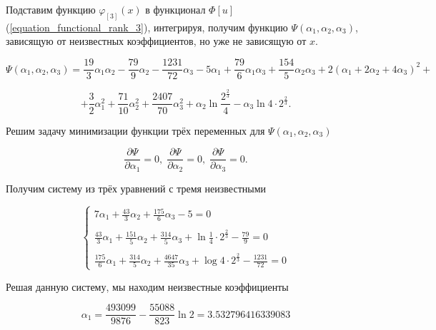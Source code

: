 \documentclass{article}
\begin{document}
\noindent Подставим функцию $\varphi_{[3]}(x)$ в функционал $\Phi[u]$ (\ref{equation_functional_rank_3}), интегрируя, получим функцию $\Psi(\alpha_{1}, \alpha_{2}, \alpha_{3})$, зависящую от неизвестных коэффициентов, но уже не зависящую от $x$.

\begin{displaymath}
	\Psi(\alpha_{1}, \alpha_{2}, \alpha_{3}) = \frac{19}{3}\alpha_{1}\alpha_{2} - \frac{79}{9}\alpha_{2} - \frac{1231}{72}\alpha_{3} - 5\alpha_{1} + \frac{79}{6}\alpha_{1}\alpha_{3} + \frac{154}{5}\alpha_{2}\alpha_{3} + 2(\alpha_{1} + 2 \alpha_{2} + 4\alpha_{3})^2 +
\end{displaymath}
	
\begin{displaymath}	
	 + \frac{3}{2}\alpha_{1}^{2} +  \frac{71}{10}\alpha_{2}^{2} + \frac{2407}{70}\alpha_{3}^{2} + \alpha_{2} \ln{\frac{2^{\frac{2}{3}}}{4}} - \alpha_{3} \ln{4 \cdot 2^{\frac{2}{3}}}.
\end{displaymath}

\noindent Решим задачу минимизации функции трёх переменных для $\Psi(\alpha_{1}, \alpha_{2}, \alpha_{3})$

\begin{displaymath}
	\frac{\partial \Psi}{\partial \alpha_{1}} = 0, \;
	\frac{\partial \Psi}{\partial \alpha_{2}} = 0, \;
	\frac{\partial \Psi}{\partial \alpha_{3}} = 0.
\end{displaymath}

\noindent Получим систему из трёх уравнений с тремя неизвестными

\begin{displaymath}
	\begin{cases}
		7\alpha_{1} + \frac{43}{3}\alpha_{2} + \frac{175}{6}\alpha_{3} - 5 = 0 \\
		\\
		\frac{43}{3}\alpha_{1} + \frac{151}{5}\alpha_{2} + \frac{314}{5}\alpha_{3} + \ln{\frac{1}{4} \cdot 2^{\frac{2}{3}}} - \frac{79}{9} = 0 \\
		\\
		\frac{175}{6}\alpha_{1} + \frac{314}{5}\alpha_{2} + \frac{4647}{35}\alpha_{3} + \log{4 \cdot 2^{\frac{2}{3}}} - \frac{1231}{72} = 0
	\end{cases}
\end{displaymath}

\noindent Решая данную систему, мы находим неизвестные коэффициенты

\begin{displaymath}
	\alpha_{1} = \frac{493099}{9876} - \frac{55088}{823}\ln{2} = 3.532796416339083
\end{displaymath}
\end{document}
